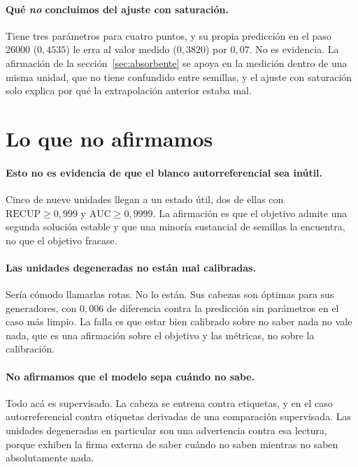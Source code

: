 \documentclass[11pt,a4paper]{article}
\begin{document}
\paragraph{Qué \emph{no} concluimos del ajuste con saturación.} Tiene tres parámetros para cuatro
puntos, y su propia predicción en el paso $26000$ ($0{,}4535$) le erra al valor medido ($0{,}3820$) por
$0{,}07$. No es evidencia. La afirmación de la sección~\ref{sec:absorbente} se apoya en la medición
dentro de una misma unidad, que no tiene confundido entre semillas, y el ajuste con saturación solo
explica por qué la extrapolación anterior estaba mal.

\section{Lo que no afirmamos}
\label{sec:noclaim}

\paragraph{Esto no es evidencia de que el blanco autorreferencial sea inútil.} Cinco de nueve unidades
llegan a un estado útil, dos de ellas con $\mathrm{RECUP} \geq 0{,}999$ y $\mathrm{AUC} \geq 0{,}9999$.
La afirmación es que el objetivo admite una segunda solución estable y que una minoría sustancial de
semillas la encuentra, no que el objetivo fracase.

\paragraph{Las unidades degeneradas no están mal calibradas.} Sería cómodo llamarlas rotas. No lo
están. Sus cabezas son óptimas para sus generadores, con $0{,}006$ de diferencia contra la predicción
sin parámetros en el caso más limpio. La falla es que estar bien calibrado sobre no saber nada no vale
nada, que es una afirmación sobre el objetivo y las métricas, no sobre la calibración.

\paragraph{No afirmamos que el modelo sepa cuándo no sabe.} Todo acá es supervisado. La cabeza se
entrena contra etiquetas, y en el caso autorreferencial contra etiquetas derivadas de una comparación
supervisada. Las unidades degeneradas en particular son una advertencia contra esa lectura, porque
exhiben la firma externa de saber cuándo no saben mientras no saben absolutamente nada.
\end{document}
